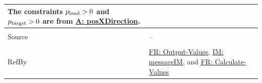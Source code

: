 \documentclass[12pt]{article}
\newcommand{\gt}{\ensuremath >}
\begin{document}
\begin{minipage}{\textwidth}
\begin{tabular}{>{\raggedright}p{}>{\raggedright\arraybackslash}p{}}
        The constraints ${p_{\text{land}}}\gt{}0$ and ${p_{\text{target}}}\gt{}0$ are from \hyperref[posXDirection]{A: posXDirection}.
        
\\ \midrule \\
Source & --
         
\\ \midrule \\
RefBy & \hyperref[outputValues]{FR: Output-Values}, \hyperref[IM:messageIM]{IM: messageIM}, and \hyperref[calcValues]{FR: Calculate-Values}
        
\\ \bottomrule
\end{tabular}
\end{minipage}

\vspace{\baselineskip}
\noindent
\end{document}
